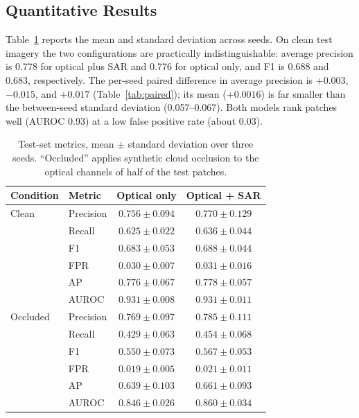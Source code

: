 \documentclass{article}
\begin{document}
\subsection{Quantitative Results}

Table~\ref{tab:results} reports the mean and standard deviation across seeds.
On clean test imagery the two configurations are practically indistinguishable:
average precision is 0.778 for optical plus SAR and 0.776 for optical only,
and F1 is 0.688 and 0.683, respectively.
The per-seed paired difference in average precision is
$+0.003$, $-0.015$, and $+0.017$ (Table~\ref{tab:paired}); its mean
($+0.0016$) is far smaller than the between-seed standard deviation
(0.057--0.067).
Both models rank patches well (AUROC 0.93) at a low false positive rate
(about 0.03).

\begin{table}[ht]
\centering
\caption{Test-set metrics, mean $\pm$ standard deviation over three seeds.
``Occluded'' applies synthetic cloud occlusion to the optical channels of half
of the test patches.}
\label{tab:results}
\small
\begin{tabular}{llcc}
\toprule
Condition & Metric & Optical only & Optical + SAR \\
\midrule
Clean    & Precision & $0.756 \pm 0.094$ & $0.770 \pm 0.129$ \\
         & Recall    & $0.625 \pm 0.022$ & $0.636 \pm 0.044$ \\
         & F1        & $0.683 \pm 0.053$ & $0.688 \pm 0.044$ \\
         & FPR       & $0.030 \pm 0.007$ & $0.031 \pm 0.016$ \\
         & AP        & $0.776 \pm 0.067$ & $0.778 \pm 0.057$ \\
         & AUROC     & $0.931 \pm 0.008$ & $0.931 \pm 0.011$ \\
\midrule
Occluded & Precision & $0.769 \pm 0.097$ & $0.785 \pm 0.111$ \\
         & Recall    & $0.429 \pm 0.063$ & $0.454 \pm 0.068$ \\
         & F1        & $0.550 \pm 0.073$ & $0.567 \pm 0.053$ \\
         & FPR       & $0.019 \pm 0.005$ & $0.021 \pm 0.011$ \\
         & AP        & $0.639 \pm 0.103$ & $0.661 \pm 0.093$ \\
         & AUROC     & $0.846 \pm 0.026$ & $0.860 \pm 0.034$ \\
\bottomrule
\end{tabular}
\end{table}
\end{document}
